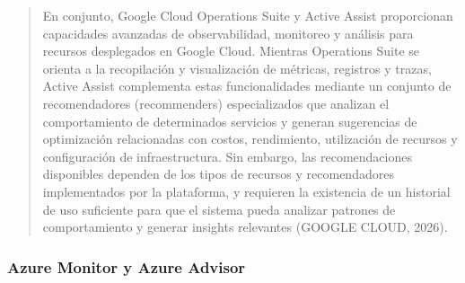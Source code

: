 \documentclass[
]{article}
\begin{document}
\begin{quote}
En conjunto, Google Cloud Operations Suite y Active Assist proporcionan
capacidades avanzadas de observabilidad, monitoreo y análisis para
recursos desplegados en Google Cloud. Mientras Operations Suite se
orienta a la recopilación y visualización de métricas, registros y
trazas, Active Assist complementa estas funcionalidades mediante un
conjunto de recomendadores (recommenders) especializados que analizan el
comportamiento de determinados servicios y generan sugerencias de
optimización relacionadas con costos, rendimiento, utilización de
recursos y configuración de infraestructura. Sin embargo, las
recomendaciones disponibles dependen de los tipos de recursos y
recomendadores implementados por la plataforma, y requieren la
existencia de un historial de uso suficiente para que el sistema pueda
analizar patrones de comportamiento y generar insights relevantes
(GOOGLE CLOUD, 2026).
\end{quote}

\subsubsection{Azure Monitor y Azure
Advisor}\label{azure-monitor-y-azure-advisor}
\end{document}
